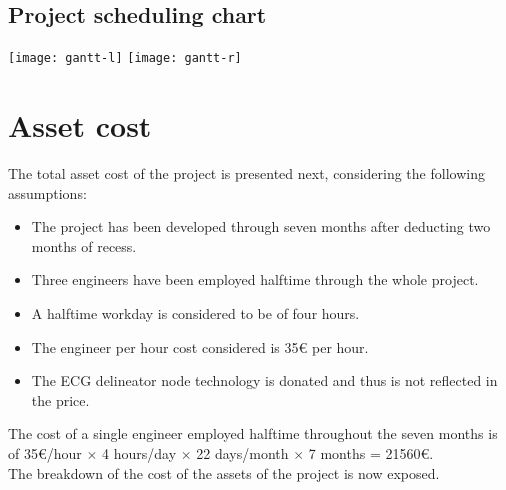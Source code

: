 	\cleartoleftpage
	\subsection{Project scheduling chart}
	\label{sec:gantt}
	    	\texttt{[image: gantt-l]}
	    	\texttt{[image: gantt-r]}

\section{Asset cost}
\label{sec:cost}
	The total asset cost of the project is presented next, considering the following assumptions:
	\begin{itemize}
		\item The project has been developed through seven months after deducting two months of recess.
		\item Three engineers have been employed halftime through the whole project.
		\item A halftime workday is considered to be of four hours.
		\item The engineer per hour cost considered is 35{\small \euro} per hour.
		\item The ECG delineator node technology is donated and thus is not reflected in the price.
	\end{itemize}

	The cost of a single engineer employed halftime throughout the seven months is of 35{\small \euro}/hour $\times$ 4 hours/day $\times$ 22 days/month $\times$ 7 months = 21560{\small \euro}.\\

	The breakdown of the cost of the assets of the project is now exposed.\\

